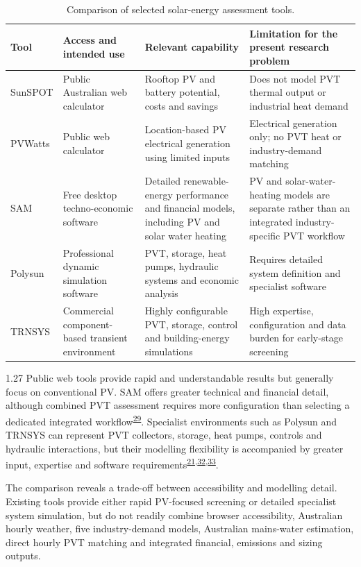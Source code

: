 \documentclass[12pt,letterpaper]{article}
\DeclareRobustCommand{\citenum}[1]{\hyperlink{ref:#1}{#1}} %
\begin{document}
\begin{table}[htbp]
\centering
\renewcommand{\thetable}{2}
\small
\begin{tabular}{@{}>{\raggedright\arraybackslash}p{0.72in}>{\raggedright\arraybackslash}p{1.48in}>{\raggedright\arraybackslash}p{1.9in}>{\raggedright\arraybackslash}p{1.9in}@{}}
\toprule
\textbf{Tool} & \textbf{Access and intended use} & \textbf{Relevant capability} & \textbf{Limitation for the present research problem} \\
\midrule
SunSPOT & Public Australian web calculator & Rooftop PV and battery potential, costs and savings & Does not model PVT thermal output or industrial heat demand \\
PVWatts & Public web calculator & Location-based PV electrical generation using limited inputs & Electrical generation only; no PVT heat or industry-demand matching \\
SAM & Free desktop techno-economic software & Detailed renewable-energy performance and financial models, including PV and solar water heating & PV and solar-water-heating models are separate rather than an integrated industry-specific PVT workflow \\
Polysun & Professional dynamic simulation software & PVT, storage, heat pumps, hydraulic systems and economic analysis & Requires detailed system definition and specialist software \\
TRNSYS & Commercial component-based transient environment & Highly configurable PVT, storage, control and building-energy simulations & High expertise, configuration and data burden for early-stage screening \\
\bottomrule
\end{tabular}
\caption{Comparison of selected solar-energy assessment tools.}
\label{tab:tool-comparison}
\end{table}

\begin{spacing}{1.27}
Public web tools provide rapid and understandable results but generally focus on conventional PV. SAM offers greater technical and financial detail, although combined PVT assessment requires more configuration than selecting a dedicated integrated workflow\textsuperscript{\citenum{29}}. Specialist environments such as Polysun and TRNSYS can represent PVT collectors, storage, heat pumps, controls and hydraulic interactions, but their modelling flexibility is accompanied by greater input, expertise and software requirements\textsuperscript{\citenum{21},\citenum{32},\citenum{33}}.\par

\vspace{0.15in}

The comparison reveals a trade-off between accessibility and modelling detail. Existing tools provide either rapid PV-focused screening or detailed specialist system simulation, but do not readily combine browser accessibility, Australian hourly weather, five industry-demand models, Australian mains-water estimation, direct hourly PVT matching and integrated financial, emissions and sizing outputs.\par
\end{spacing}
\end{document}
